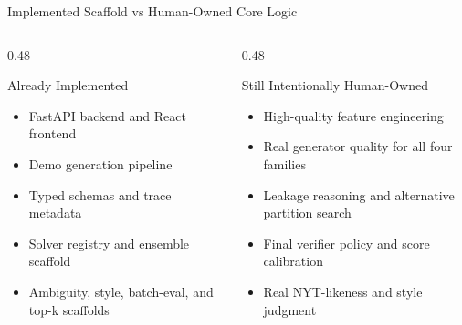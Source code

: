 \documentclass[11pt,aspectratio=169]{beamer}
\begin{document}
\begin{frame}{Implemented Scaffold vs Human-Owned Core Logic}
  \begin{columns}[T,onlytextwidth]
    \begin{column}{0.48\textwidth}
      \begin{exampleblock}{Already Implemented}
        \begin{itemize}
          \item FastAPI backend and React frontend
          \item Demo generation pipeline
          \item Typed schemas and trace metadata
          \item Solver registry and ensemble scaffold
          \item Ambiguity, style, batch-eval, and top-k scaffolds
        \end{itemize}
      \end{exampleblock}
    \end{column}
    \begin{column}{0.48\textwidth}
      \begin{alertblock}{Still Intentionally Human-Owned}
        \begin{itemize}
          \item High-quality feature engineering
          \item Real generator quality for all four families
          \item Leakage reasoning and alternative partition search
          \item Final verifier policy and score calibration
          \item Real NYT-likeness and style judgment
        \end{itemize}
      \end{alertblock}
    \end{column}
  \end{columns}
\end{frame}
\end{document}
